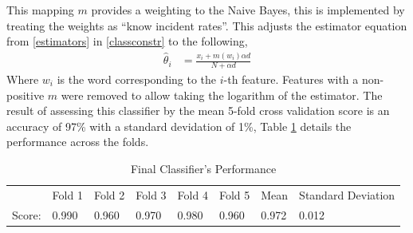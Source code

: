 \documentclass[12pt, a4paper]{article}
\begin{document}
\begin{minipage}{\linewidth}
	This mapping $m$ provides a weighting to the Naive Bayes, this is implemented by treating the weights as ``know incident rates''. This adjusts the estimator equation  from \ref{estimators} in \ref{classconstr} to the following,
  \begin{align*}
		\hat{\theta}_i &= \frac{x_i + m(w_i) \alpha d}{N + \alpha d}
	\end{align*}
	Where $w_i$ is the word corresponding to the $i$-th feature. Features with a non-positive $m$ were removed to allow taking the logarithm of the estimator. The result of assessing this classifier by the mean 5-fold cross validation score is an accuracy of 97\% with a standard devidation of 1\%, Table \ref{finalperf} details the performance across the folds.

	\begin{table}[H]
	\centering
	\caption{Final Classifier's Performance}
	\label{finalperf}
	\begin{tabular}{llllllll}
     & Fold 1 & Fold 2 & Fold 3 & Fold 4 & Fold 5 & Mean & Standard Deviation \\
		 Score: & 0.990 & 0.960 & 0.970 & 0.980 & 0.960 & 0.972 & 0.012
	\end{tabular}
	\end{table}

	\end{minipage}
\end{document}

